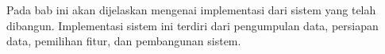 Pada bab ini akan dijelaskan mengenai implementasi dari sistem yang telah dibangun. Implementasi sistem ini terdiri dari pengumpulan data, persiapan data, pemilihan fitur, dan pembangunan sistem.
